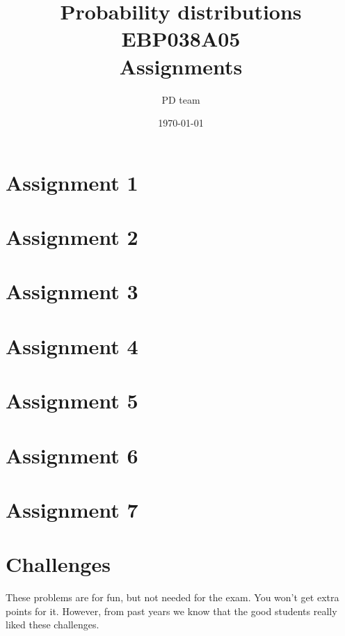 \documentclass[a4paper,12pt]{article}
\author{PD team}
\date{\today}
\title{Probability distributions EBP038A05\\
Assignments}
\begin{document}
\maketitle
\tableofcontents





\section{Assignment 1}






\section{Assignment 2}





\section{Assignment 3}







\section{Assignment 4}






\section{Assignment 5}







\section{Assignment 6}






\section{Assignment 7}





\clearpage
\section{Challenges}
These problems are for fun, but not needed for the exam. You won't get extra points for it. However, from past years we know that the good students really liked these challenges.












% 
% 
\end{document}
